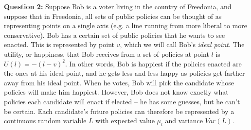 \documentclass[11pt]{article}
\begin{document}
\noindent \textbf{Question 2:} Suppose Bob is a voter living in the country of Freedonia, and suppose that in Freedonia, all sets of public policies can be thought of as representing points on a single axis (e.g. a line running from more liberal to more conservative). Bob has a certain set of public policies that he wants to see enacted. This is represented by point $v$, which we will call Bob's \textit{ideal point}. The utility, or happiness, that Bob receives from a set of policies at point $l$ is $U(l)=-(l-v)^2$. In other words, Bob is happiest if the policies enacted are the ones at his ideal point, and he gets less and less happy as policies get farther away from his ideal point. When he votes, Bob will pick the candidate whose policies will make him happiest. However, Bob does not know exactly what policies each candidate will enact if elected -- he has some guesses, but he can't be certain. Each candidate's future policies can therefore be represented by a continuous random variable $L$ with expected value $\mu_l$ and variance $Var(L)$.
\end{document}
